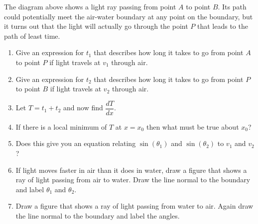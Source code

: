 \documentclass{amsbook}
\begin{document}
	The diagram above shows a light ray passing from point $A$ to point $B$. Its path could potentially meet the air-water boundary at any point on the boundary, but it turns out that the light will actually go through the point $P$ that leads to the path of least time.
\begin{enumerate}
	\item Give an expression for $t_1$ that describes how long it takes to go from point $A$ to point $P$ if light travels at $v_1$ through air.
	\item Give an expression for $t_2$ that describes how long it takes to go from point $P$ to point $B$ if light travels at $v_2$ through air.
	\item Let $T=t_1+t_2$ and now find $\dfrac{dT}{dx}$.
	
	\item If there is a local minimum of $T$ at $x=x_0$ then what must be true about $x_0$?
	\item Does this give you an equation relating $\sin (\theta_1)$ and $\sin (\theta_2)$ to $v_1$ and $v_2$?
	\item If light moves faster in air than it does in water, draw a figure that shows a ray of light passing from air to water. Draw the line normal to the boundary and label $\theta_1$ and $\theta_2$.
	\item Draw a figure that shows a ray of light passing from water to air. Again draw the line normal to the boundary and label the angles.
	
\end{enumerate}
\end{document}
